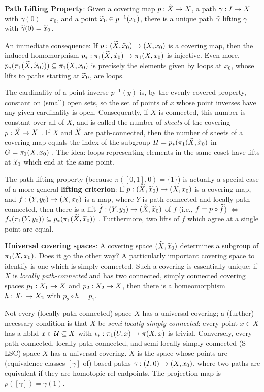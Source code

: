 \documentclass[12pt]{article}
\begin{document}
{\bf Path Lifting Property}: Given 
a covering map $p:\widetilde{X}\rightarrow X$, a path 
$\gamma:I\rightarrow X$ with $\gamma(0)=x_0$, and a point 
$\widetilde{x}_0\in p^{-1}(x_0)$, there is a unique path $\widetilde{\gamma}$
lifting $\gamma$ with $\widetilde{\gamma}(0)=\widetilde{x}_0$.

\ssk

An immediate consequence: 
If $p:(\widetilde{X},\tilde{x}_0)\rightarrow (X,x_0)$ is a covering map, then the 
induced homomorphism
$p_*:\pi_1(\widetilde{X},\widetilde{x}_0)\rightarrow \pi_1(X,x_0)$ is injective.
Even more, $p_*(\pi_1(\widetilde{X},\widetilde{x}_0)))\subseteq \pi_1(X,x_0)$
is precisely the elements given by loops at $x_0$, 
whose lifts to paths starting at $\widetilde{x}_0$, are loops. 

The cardinality of a point inverse $p^{-1}(y)$ is, by the evenly
covered property, constant on (small) open sets, so the set of 
points of $x$ whose point inverses have any given cardinality
is open. Consequently, if $X$ is connected, this number
is constant over all of $X$, and is called the number of {\it sheets}
of the covering $p:\widetilde{X}\rightarrow X$ . 
If $X$ and $\widetilde{X}$ are 
path-connected, then the number of sheets of a covering map equals
the index of the subgroup $H=p_*(\pi_1(\widetilde{X},\widetilde{x}_0)$ in 
$G=\pi_1(X,x_0)$ . The idea: loops representing elements in the same coset have lifts
at $\widetilde{x}_0$ which end at the same point.

\ssk

The path lifting property (because $\pi([0,1],0)=\{1\}$) is actually a special
case of a more general {\bf lifting criterion}: If 
$p:(\widetilde{X},\widetilde{x}_0)\rightarrow (X,x_0)$ is a covering map, and 
$f:(Y,y_0)\rightarrow (X,x_0)$ is a map, where
$Y$ is path-connected and locally path-connected, then there is a lift 
$\widetilde{f}:(Y,y_0)\rightarrow (\widetilde{X},\widetilde{x}_0)$ of $f$ (i.e., 
$f=p\circ\widetilde{f}$) $\Leftrightarrow$ 
$f_*(\pi_1(Y,y_0))\subseteq p_*(\pi_1(\widetilde{X},\widetilde{x}_0))$ . 
Furthermore, two lifts of $f$ which agree at a single point are equal.

\ssk

{\bf Universal covering spaces}:
A covering space $(\widetilde{X},\widetilde{x}_0)$ determines a subgroup of $\pi_1(X,x_0)$. Does it go the
other way? A particularly
important covering space to identify 
is one which is simply connected. Such a covering 
is essentially unique: if $X$ is {\it locally path-connected} and has two connected, simply connected
covering spaces $p_1:X_1\rightarrow X$ and $p_2:X_2\rightarrow X$, then
there is a homeomorphism $h:X_1\rightarrow X_2$ with $p_2\circ h = p_1$.

Not every (locally path-connected) space $X$ has a universal covering; a 
(further) necessary condition is that $X$ be {\it semi-locally simply connected}:
every point $x\in X$ has a nbhd $x\in{\mathcal U}\subseteq X$ with $\iota_*:\pi_1(U,x)\rightarrow\pi(X,x)$ is trivial.
Conversely, every path connected, locally path connected, and
semi-locally simply connected (S-LSC) space $X$ has a universal covering.
$\widetilde{X}$ is the space whose
points are (equivalence classes $[\gamma]$ of)
based paths $\gamma:(I,0)\rightarrow (X,x_0)$, where two paths are equivalent
if they are homotopic rel endpoints. The projection map is
$p([\gamma])=\gamma(1)$. 
\end{document}
